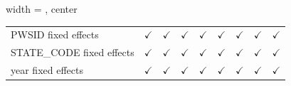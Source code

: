 \begin{table}[htbp]
\begin{adjustbox}{width = \textwidth, center}
\begin{tabular}{lcccccccc}
          \\
         PWSID fixed effects               & $\checkmark$     & $\checkmark$    & $\checkmark$                  & $\checkmark$          & $\checkmark$     & $\checkmark$    & $\checkmark$                  & $\checkmark$\\   
         STATE\_CODE fixed effects         & $\checkmark$     & $\checkmark$    & $\checkmark$                  & $\checkmark$          & $\checkmark$     & $\checkmark$    & $\checkmark$                  & $\checkmark$\\   
         year fixed effects                & $\checkmark$     & $\checkmark$    & $\checkmark$                  & $\checkmark$          & $\checkmark$     & $\checkmark$    & $\checkmark$                  & $\checkmark$\\   
         \bottomrule
      \end{tabular}
   \end{adjustbox}
\end{table}


